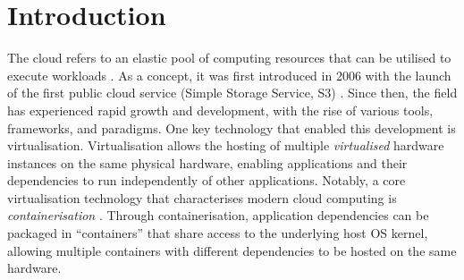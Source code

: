 








\newpage

\tableofcontents


\newpage


\chapter{Introduction}

The cloud refers to an elastic pool of computing resources that can be utilised to execute workloads \cite{editorCloudComputingGlossary}. As a concept, it was first introduced in 2006 with the launch of the first public cloud service (Simple Storage Service, S3) \cite{liuReviewDigitalTwin2021}. Since then, the field has experienced rapid growth and development, with the rise of various tools, frameworks, and paradigms. One key technology that enabled this development is virtualisation. Virtualisation allows the hosting of multiple \textit{virtualised} hardware instances on the same physical hardware, enabling applications and their dependencies to run independently of other applications. Notably, a core virtualisation technology that characterises modern cloud computing is \textit{containerisation} \cite{pereiraferreiraPerformanceEvaluationContainers2019}. Through containerisation, application dependencies can be packaged in “containers” that share access to the underlying host OS kernel, allowing multiple containers with different dependencies to be hosted on the same hardware.


